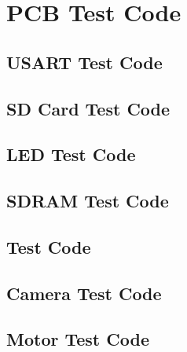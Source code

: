 \chapter{PCB Test Code} \label{Appendix:TestCode}

\section{USART Test Code}

\section{SD Card Test Code}

\section{LED Test Code}

\section{SDRAM Test Code}

\section{\itc Test Code}

\section{Camera Test Code}

\section{Motor Test Code}

